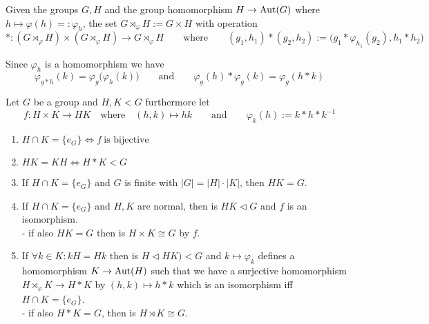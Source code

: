 \begin{definition}
   Given the groups \(G, H\) and the group homomorphism \(H \to \operatorname{Aut}(G)\) where \(h \mapsto \varphi(h) =: \varphi_h\), the set \(G \rtimes_\varphi H := G \times H\) with operation
   \[\ast: (G \rtimes_\varphi H) \times (G \rtimes_\varphi H) \to G \rtimes_\varphi H \qquad\text{where}\qquad (g_1, h_1) \ast (g_2, h_2) := \big(g_1 \ast \varphi_{h_1}(g_2), h_1 \ast h_2\big)\]
\end{definition}
\begin{remark}
   Since \(\varphi_h\) is a homomorphism we have
   \[\varphi_{g \ast h}(k) = \varphi_g\big(\varphi_h(k)\big) \qquad\text{and}\qquad \varphi_g(h) \ast \varphi_g(k) = \varphi_g(h \ast k)\]
\end{remark}

\begin{proposition}\label{pro:dir_semidir_prod}
   Let \(G\) be a group and \(H, K < G\) furthermore let
   \[f: H \times K \to HK \quad\text{where}\quad (h,k) \mapsto hk \qquad\text{and}\qquad \varphi_k(h) := k \ast h \ast k^{-1}\]

   \begin{enumerate}[label=\roman*, align=Center]
      \item \(H \cap K = \{e_G\} \iff f~\text{is bijective}\)
      \item \(HK = KH \iff H \ast K < G\)
      \item If \(H \cap K = \{e_G\}\) and \(G\) is finite with \(|G| = |H| \cdot |K|\), then \(HK = G\).
      \item If \(H \cap K = \{e_G\}\) and \(H, K\) are normal, then is \(HK \triangleleft G\) and \(f\) is an isomorphism. \\
      - if also \(HK = G\) then is \(H \times K \cong G\) by \(f\).
      \item If \(\forall k \in K: kH = Hk\) then is \(H \triangleleft HK) < G\) and \(k \mapsto \varphi_k\) defines a homomorphism \(K \to \operatorname{Aut}(H)\) such that we have a surjective homomorphism \(H \rtimes_{\varphi} K \to H \ast K\) by \((h,k) \mapsto h \ast k\) which is an isomorphism iff \(H \cap K = \{e_G\}\). \\
      - if also \(H \ast K = G\), then is \(H \rtimes K \cong G\).
   \end{enumerate}
\end{proposition}
